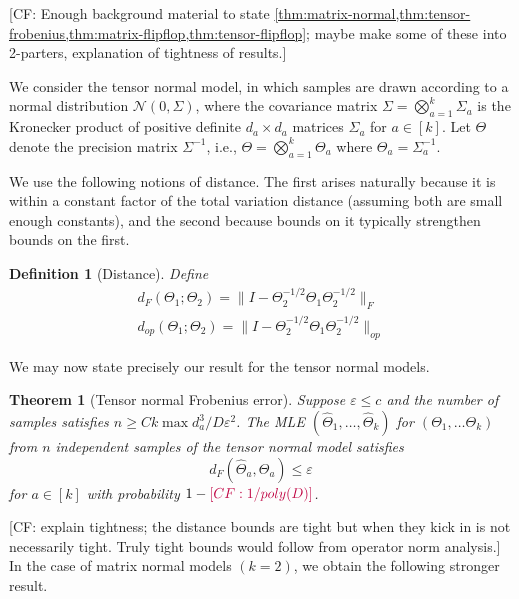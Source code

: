 \documentclass{article}
\newtheorem{theorem}{Theorem}
\newtheorem{definition}{Definition}
\newcommand\eps{\varepsilon}
\newcommand\cN{\mathcal{N}}
\newcommand{\CF}[1]{{\color{purple}[CF: #1]}}
\begin{document}
\CF{Enough background material to state \cref{thm:matrix-normal,thm:tensor-frobenius,thm:matrix-flipflop,thm:tensor-flipflop}; maybe make some of these into 2-parters, explanation of tightness of results.}

We consider the tensor normal model, in which samples are drawn according to a normal distribution $\cN(0, \Sigma)$, where the covariance matrix $\Sigma = \bigotimes_{a = 1}^{k} \Sigma_a$ is the Kronecker product of positive definite $d_a\times d_a$ matrices $\Sigma_a$ for $a\in [k]$.
Let $\Theta$ denote the precision matrix $\Sigma^{-1}$, i.e., $\Theta = \bigotimes_{a=1}^k \Theta_a$ where $\Theta_a = \Sigma_a^{-1}$.

We use the following notions of distance. The first arises naturally because it is within a constant factor of the total variation distance (assuming both are small enough constants), and the second because bounds on it typically strengthen bounds on the first.

\begin{definition}[Distance]
Define
\begin{align}d_{F}(\Theta_1; \Theta_2) = \| I - \Theta_2^{-1/2} \Theta_1 \Theta_2^{-1/2}\|_F\\
d_{op}(\Theta_1; \Theta_2) = \| I - \Theta_2^{-1/2} \Theta_1 \Theta_2^{-1/2}\|_{op}
\end{align}
\end{definition}

We may now state precisely our result for the tensor normal models.

\begin{theorem}[Tensor normal Frobenius error]\label{thm:tensor-frobenius} Suppose $\eps \leq c$ and the number of samples satisfies $n \geq C k \max d_{a}^3/D\eps^2$. The MLE $(\widehat{\Theta}_1, \dots, \widehat{\Theta}_k) $ for $(\Theta_1, \dots \Theta_k)$ from $n$ independent samples of the tensor normal model satisfies
$$ d_{F}(\widehat{\Theta}_a, \Theta_a) \leq \eps $$
for $a \in [k]$ with probability $1 - \CF{1/poly(D)}$.
\end{theorem}

\CF{explain tightness; the distance bounds are tight but when they kick in is not necessarily tight. Truly tight bounds would follow from operator norm analysis.} In the case of matrix normal models $(k=2)$, we obtain the following stronger result.
\end{document}
